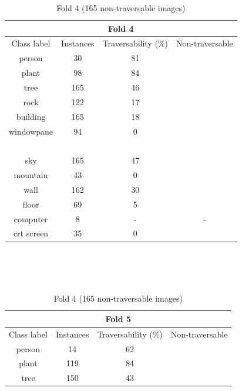 \documentclass[12pt,a4paper,table,dvipsnames,tikz]{report}
\newcommand{\white}[1]{\textbf{\textcolor{white}{#1}}} %
\begin{document}
	\begin{table}[h!]
		\ContinuedFloat %
		\begin{subtable}[h!]{\textwidth}
			\centering
			\begin{tabular}{|c|c|c|c|}
				\hline
				\multicolumn{4}{|c|}{Fold 4}\\
				\hline
				Class label & Instances & Traversability (\%) & Non-traversable\\
				\hline\hline
				person & 30 & 81 &\\
				\hline
				plant & 98 & 84 &\\
				\hline
				\rowcolor{tree}
				tree & 165 & 46 & \checkmark\\
				\hline
				rock & 122 & 17 & \checkmark\\
				\hline
				building & 165 & 18 & \checkmark\\
				\hline
				windowpane & 94 & 0 & \checkmark\\
				\hline
				\rowcolor{earth}
				\white{earth} & \white{165} & \white{48} & \white{\checkmark}\\
				\hline
				\rowcolor{sky}
				sky & 165 & 47 & \checkmark\\
				\hline
				mountain & 43 & 0 & \checkmark\\
				\hline
				wall & 162 & 30 & \checkmark\\
				\hline
				floor & 69 & 5 & \checkmark\\
				\hline
				computer & 8 & - & -\\
				\hline
				crt screen & 35 & 0 & \checkmark\\
				\hline
			\end{tabular}
			\caption{Fold 4 (165 non-traversable images)}
			\label{table:obst.f4}
		\end{subtable}
		\\\\\\
		\begin{subtable}[h!]{\textwidth}
			\centering
			\begin{tabular}{|c|c|c|c|}
				\hline
				\multicolumn{4}{|c|}{Fold 5}\\
				\hline
				Class label & Instances & Traversability (\%) & Non-traversable\\
				\hline\hline
				person & 14 & 62 &\\
				\hline
				plant & 119 & 84 &\\
				\hline
				\rowcolor{tree}
				tree & 150 & 43 & \checkmark\\

\end{tabular}
\end{subtable}
\end{table}
\end{document}
